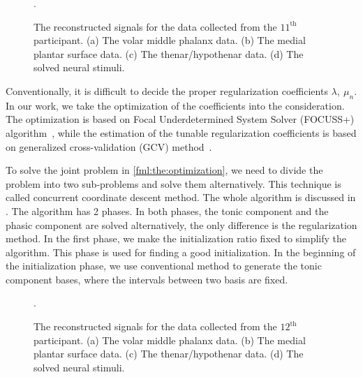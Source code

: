 \documentclass[10pt,conference]{ieeeconf}
\begin{document}
\begin{figure}[!tb]
  \centering
  \DeclareGraphicsExtensions.
  \caption{The reconstructed signals for the data collected from the $11^{\mathrm{th}}$ participant. (a) The volar middle phalanx data. (b) The medial plantar surface data. (c) The thenar/hypothenar data. (d) The solved neural stimuli.} \label{fig:results}
\end{figure}

Conventionally, it is difficult to decide the proper regularization coefficients $\lambda,~\mu_n$. In our work, we take the optimization of the coefficients into the consideration. The optimization is based on Focal Underdetermined System Solver (FOCUSS+) algorithm~\cite{murray2005visual}, while the estimation of the tunable regularization coefficients is based on  generalized cross-validation (GCV) method~\cite{zdunek2008improved}. 

To solve the joint problem in \eqref{fml:the:optimization}, we need to divide the problem into two sub-problems and solve them alternatively. This technique is called concurrent coordinate descent method. The whole algorithm is discussed in . The algorithm has 2 phases. In both phases, the tonic component and the phasic component are solved alternatively, the only difference is the regularization method. In the first phase, we make the initialization ratio fixed to simplify the algorithm. This phase is used for finding a good initialization. In the beginning of the initialization phase, we use conventional method to generate the tonic component bases, where the intervals between two basis are fixed.

\begin{figure}[!tb]
  \centering
  \DeclareGraphicsExtensions.
  \caption{The reconstructed signals for the data collected from the $12^{\mathrm{th}}$ participant. (a) The volar middle phalanx data. (b) The medial plantar surface data. (c) The thenar/hypothenar data. (d) The solved neural stimuli.} \label{fig:12results}
\end{figure}
\end{document}
